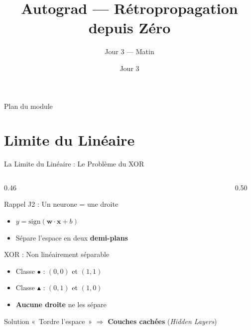 \documentclass[aspectratio=169, 10pt]{beamer}
\title[Autograd]{Autograd --- Rétropropagation depuis Zéro}
\subtitle{Jour 3 --- Matin}
\date{Jour 3}
\begin{document}

\begin{frame}
  \titlepage
\end{frame}

\begin{frame}{Plan du module}
  \tableofcontents
\end{frame}

\section{Limite du Linéaire}

\begin{frame}{La Limite du Linéaire : Le Problème du XOR}
  \begin{columns}[T]
    \begin{column}{0.46\textwidth}
      \begin{block}{Rappel J2 : Un neurone = une droite}
        \begin{itemize}
          \item $y = \text{sign}(\bm{w} \cdot \bm{x} + b)$
          \item Sépare l'espace en deux \textbf{demi-plans}
        \end{itemize}
      \end{block}
      \smallskip
      \begin{alertblock}{XOR : Non linéairement séparable}
        \begin{itemize}
          \item Classe {\color{jedy_blue}$\bullet$} : $(0,0)$ et $(1,1)$
          \item Classe {\color{jedy_alert}$\blacktriangle$} : $(0,1)$ et $(1,0)$
          \item \textbf{Aucune droite} ne les sépare
        \end{itemize}
      \end{alertblock}
      \smallskip
      \begin{exampleblock}{Solution}
        «~Tordre l'espace~» $\Rightarrow$ \textbf{Couches cachées} (\textit{Hidden Layers})
      \end{exampleblock}
    \end{column}
    \begin{column}{0.50\textwidth}
      \centering
      \begin{tikzpicture}

\end{tikzpicture}
\end{column}
\end{columns}
\end{frame}
\end{document}
